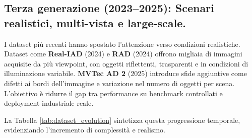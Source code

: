 \subsection{Terza generazione (2023–2025): Scenari realistici, multi-vista e large-scale.}
I dataset più recenti hanno spostato l'attenzione verso condizioni realistiche. Dataset come \textbf{Real-IAD} (2024) \cite{ding2024realiad} e \textbf{RAD} (2024)  \cite{liu2024rad} offrono migliaia di immagini acquisite da più viewpoint, con oggetti riflettenti, trasparenti e in condizioni di illuminazione variabile. \textbf{MVTec AD 2} (2025) \cite{bergmann2025mvtecad2} introduce sfide aggiuntive come difetti ai bordi dell'immagine e variazione nel numero di oggetti per scena. L'obiettivo è ridurre il gap tra performance su benchmark controllati e deployment industriale reale.

La Tabella \ref{tab:dataset_evolution} sintetizza questa progressione temporale, evidenziando l'in\-cre\-men\-to di complessità e realismo.

